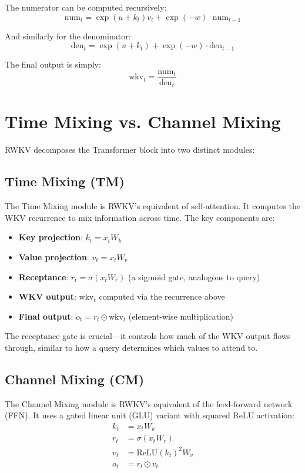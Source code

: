 \documentclass[12pt]{article}
\begin{document}
The numerator can be computed recursively:
\begin{equation}
    \text{num}_t = \exp(u + k_t) v_t + \exp(-w) \cdot \text{num}_{t-1}
\end{equation}

And similarly for the denominator:
\begin{equation}
    \text{den}_t = \exp(u + k_t) + \exp(-w) \cdot \text{den}_{t-1}
\end{equation}

The final output is simply:
\begin{equation}
    \text{wkv}_t = \frac{\text{num}_t}{\text{den}_t}
\end{equation}

\section*{Time Mixing vs. Channel Mixing}

RWKV decomposes the Transformer block into two distinct modules:

\subsection*{Time Mixing (TM)}
The Time Mixing module is RWKV's equivalent of self-attention. It computes the WKV recurrence to mix information across time. The key components are:
\begin{itemize}
    \item \textbf{Key projection}: $k_t = x_t W_k$
    \item \textbf{Value projection}: $v_t = x_t W_v$
    \item \textbf{Receptance}: $r_t = \sigma(x_t W_r)$ (a sigmoid gate, analogous to query)
    \item \textbf{WKV output}: $\text{wkv}_t$ computed via the recurrence above
    \item \textbf{Final output}: $o_t = r_t \odot \text{wkv}_t$ (element-wise multiplication)
\end{itemize}

The receptance gate is crucial—it controls how much of the WKV output flows through, similar to how a query determines which values to attend to.

\subsection*{Channel Mixing (CM)}
The Channel Mixing module is RWKV's equivalent of the feed-forward network (FFN). It uses a gated linear unit (GLU) variant with squared ReLU activation:
\begin{align}
    k_t &= x_t W_k \\
    r_t &= \sigma(x_t W_r) \\
    v_t &= \text{ReLU}(k_t)^2 W_v \\
    o_t &= r_t \odot v_t
\end{align}
\end{document}
